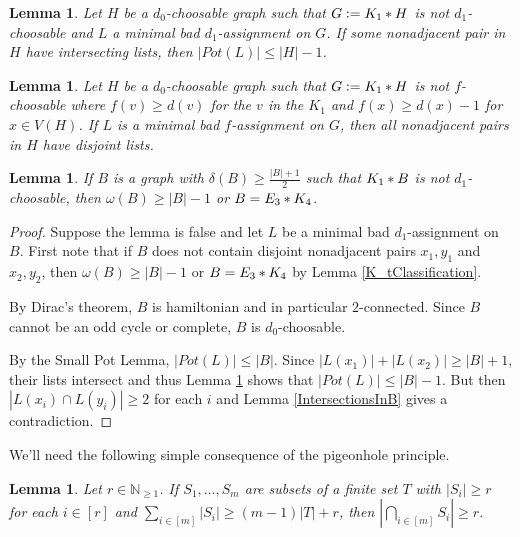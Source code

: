 \documentclass[12pt]{article}
\theoremstyle{plain}
\newtheorem{lem}[thm]{Lemma}
\theoremstyle{definition}
\theoremstyle{remark}
\newcommand{\IN}{\mathbb{N}}
\newcommand{\card}[1]{\left|#1\right|}
\newcommand{\irange}[1]{\left[#1\right]}
\newcommand{\join}[2]{#1 \mbox{\hspace{2 pt}$\ast$\hspace{2 pt}} #2}
\newcommand{\DefinedAs}{\mathrel{\mathop:}=}
\begin{document}
\begin{lem}\label{NeighborhoodPotShrink}
Let $H$ be a $d_0$-choosable graph such that $G \DefinedAs \join{K_1}{H}$ is not
$d_1$-choosable and $L$ a minimal bad $d_1$-assignment on $G$.  If some
nonadjacent pair in $H$ have intersecting lists, then $\card{Pot(L)} \leq \card{H} - 1$.
\end{lem}

\begin{lem}\label{LowSinglePair}
Let $H$ be a $d_0$-choosable graph such that $G \DefinedAs \join{K_1}{H}$ is not
$f$-choosable where $f(v) \geq d(v)$ for the $v$ in the $K_1$ and $f(x) \geq
d(x) - 1$ for $x \in V(H)$. If $L$ is a minimal bad $f$-assignment on $G$, then
all nonadjacent pairs in $H$ have disjoint lists.
\end{lem}

\begin{lem}\label{neighborhood}
If $B$ is a graph with $\delta(B) \geq \frac{\card{B} + 1}{2}$ such that
$\join{K_1}{B}$ is not $d_1$-choosable, then $\omega(B) \geq \card{B} - 1$ or
$B = \join{E_3}{K_4}$.
\end{lem}
\begin{proof}
Suppose the lemma is false and let $L$ be a minimal bad $d_1$-assignment on $B$.
First note that if $B$ does not contain disjoint nonadjacent pairs $x_1, y_1$
and $x_2, y_2$, then $\omega(B) \geq \card{B} - 1$ or
$B = \join{E_3}{K_4}$ by Lemma \ref{K_tClassification}.

By Dirac's theorem, $B$ is hamiltonian and in particular $2$-connected. Since
$B$ cannot be an odd cycle or complete, $B$ is $d_0$-choosable.

By the Small Pot Lemma, $\card{Pot(L)} \leq \card{B}$.  Since $\card{L(x_1)} +
\card{L(x_2)} \geq \card{B} + 1$, their lists intersect and thus Lemma
\ref{NeighborhoodPotShrink} shows that $\card{Pot(L)} \leq \card{B} - 1$. But
then $\card{L(x_i) \cap L(y_i)} \geq 2$ for each $i$ and Lemma
\ref{IntersectionsInB} gives a contradiction.
\end{proof}

We'll need the following simple consequence of the pigeonhole principle.

\begin{lem}\label{BasicFiniteSets}
Let $r \in \IN_{\geq 1}$. If $S_1, \ldots, S_m$ are subsets of a finite set $T$ with $\card{S_i} \geq r$ for each $i \in \irange{r}$ and $\sum_{i \in \irange{m}} \card{S_i} \geq (m - 1)\card{T} + r$, then $\card{\bigcap_{i \in \irange{m}} S_i} \geq r$.
\end{lem}
\end{document}
